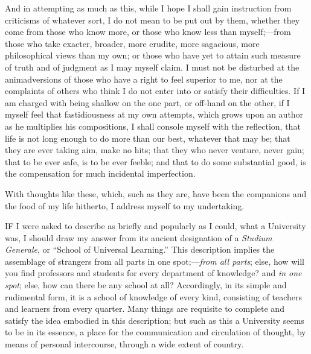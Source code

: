 And in attempting as much as this, while I hope I shall gain
instruction from criticisms of whatever sort, I do not mean to be put
out by them, whether they come from those who know more, or those who
know less than myself;—from those who take exacter, broader, more
erudite, more sagacious, more philosophical views than my own; or
those who have yet to attain such measure of truth and of judgment as
I may myself claim. I must not be disturbed at the animadversions of
those who have a right to feel superior to me, nor at the complaints
of others who think I do not enter into or satisfy their difficulties.
If I am charged with being shallow on the one part, or off-hand on the
other, if I myself feel that fastidiousness at my own attempts, which
grows upon an author as he multiplies his compositions, I shall
console myself with the reflection, that life is not long enough to do
more than our best, whatever that may be; that they are ever taking
aim, make no hits; that they who never venture, never gain; that to be
ever safe, is to be ever feeble; and that to do some substantial good,
is the compensation for much incidental imperfection.

With thoughts like these, which, such as they are, have been the
companions and the food of my life hitherto, I address myself to my
undertaking.


IF I were asked to describe as briefly
and popularly as I could, what a University was, I should draw my
answer from its ancient designation of a \emph{Studium Generale}, or
``School of Universal Learning.'' This description implies the
assemblage of strangers from all parts in one spot;—\emph{from all
parts}; else, how will you find professors and students for every
department of knowledge? and \emph{in one spot}; else, how can there
be any school at all? Accordingly, in its simple and rudimental form,
it is a school of knowledge of every kind, consisting of teachers and
learners from every quarter. Many things are requisite to complete and
satisfy the idea embodied in this description; but such as this a
University seems to be in its essence, a place for the communication
and circulation of thought, by means of personal intercourse, through
a wide extent of country.

